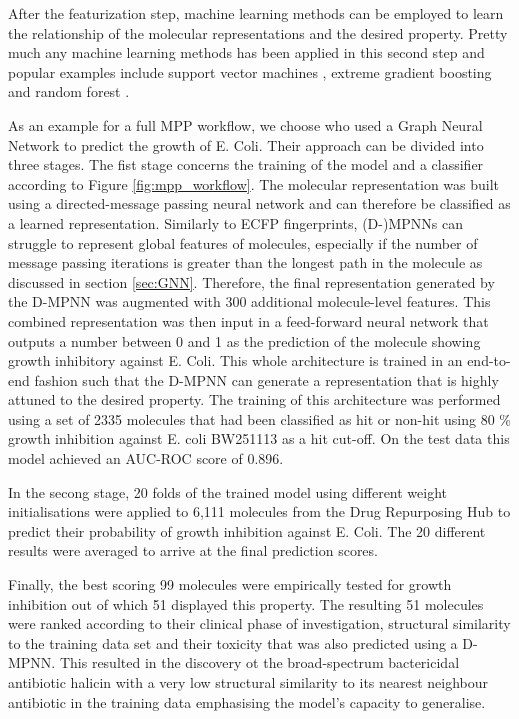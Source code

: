 After the featurization step, machine learning methods can be employed to learn the relationship of the molecular representations and the desired property. Pretty much any machine learning methods has been applied in this second step \cite{SHEN201929} and popular examples include support vector machines \cite{supv1, supv2}, extreme gradient boosting \cite{XG1, XG2} and random forest \cite{RF1}.

As an example for a full MPP workflow, we choose \cite{STOKES2020688} who used a Graph Neural Network to predict the growth of E. Coli. Their approach can be divided into three stages. The fist stage concerns the training of the model and a classifier according to Figure \ref{fig:mpp_workflow}. The molecular representation was built using a directed-message passing neural network \cite{yangMPP} and can therefore be classified as a learned representation. Similarly to ECFP fingerprints, (D-)MPNNs can struggle to represent global features of molecules, especially if the number of message passing iterations is greater than the longest path in the molecule as discussed in section \ref{sec:GNN}. Therefore, the final representation generated by the D-MPNN was augmented with 300 additional molecule-level features. This combined representation was then input in a feed-forward neural network that outputs a number between 0 and 1 as the prediction of the molecule showing growth inhibitory against E. Coli. This whole architecture is trained in an end-to-end fashion such that the D-MPNN can generate a representation that is highly attuned to the desired property.
The training of this architecture was performed using a set of 2335 molecules that had been classified as hit or non-hit using 80 \% growth inhibition against E. coli BW251113 \cite{ZAMPIERI20171214} as a hit cut-off. On the test data this model achieved an AUC-ROC score of 0.896.

In the secong stage, 20 folds of the trained model using different weight initialisations were applied to 6,111 molecules from the Drug Repurposing Hub \citep{corsello} to predict their probability of growth inhibition against E. Coli. The 20 different results were averaged to arrive at the final prediction scores. 

Finally, the best scoring 99 molecules were empirically tested for growth inhibition out of which 51 displayed this property. The resulting 51 molecules were ranked according to their clinical phase of investigation, structural similarity to the training data set and their toxicity that was also predicted using a D-MPNN. This resulted in the discovery ot the broad-spectrum bactericidal antibiotic halicin with a very low structural similarity to its nearest neighbour antibiotic in the training data emphasising the model's capacity to generalise. 

